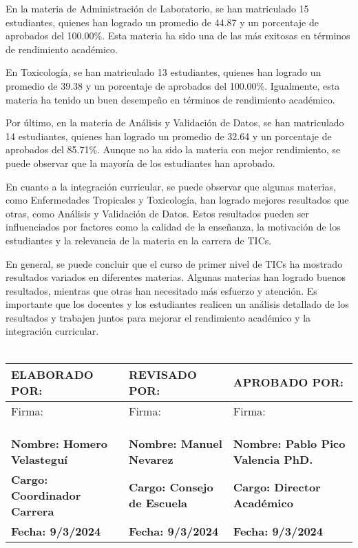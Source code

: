 En la materia de Administración de Laboratorio, se han matriculado 15 estudiantes, quienes han logrado un promedio de 44.87 y un porcentaje de aprobados del 100.00\%. Esta materia ha sido una de las más exitosas en términos de rendimiento académico.

En Toxicología, se han matriculado 13 estudiantes, quienes han logrado un promedio de 39.38 y un porcentaje de aprobados del 100.00\%. Igualmente, esta materia ha tenido un buen desempeño en términos de rendimiento académico.

Por último, en la materia de Análisis y Validación de Datos, se han matriculado 14 estudiantes, quienes han logrado un promedio de 32.64 y un porcentaje de aprobados del 85.71\%. Aunque no ha sido la materia con mejor rendimiento, se puede observar que la mayoría de los estudiantes han aprobado.

En cuanto a la integración curricular, se puede observar que algunas materias, como Enfermedades Tropicales y Toxicología, han logrado mejores resultados que otras, como Análisis y Validación de Datos. Estos resultados pueden ser influenciados por factores como la calidad de la enseñanza, la motivación de los estudiantes y la relevancia de la materia en la carrera de TICs.

En general, se puede concluir que el curso de primer nivel de TICs ha mostrado resultados variados en diferentes materias. Algunas materias han logrado buenos resultados, mientras que otras han necesitado más esfuerzo y atención. Es importante que los docentes y los estudiantes realicen un análisis detallado de los resultados y trabajen juntos para mejorar el rendimiento académico y la integración curricular.\\
\vspace{1cm}\\\begin{tabularx}{\textwidth}{|X|X|X|}
    \hline
    \textbf{ELABORADO POR:} & \textbf{REVISADO POR:} & \textbf{APROBADO POR:} \\ \hline
    Firma: & Firma: & Firma:\\
    &&\\
    &&\\
    &&\\ \hline
    \textbf{Nombre: Homero Velasteguí} & \textbf{Nombre: Manuel Nevarez} & \textbf{Nombre: Pablo Pico Valencia PhD.} \\ \hline
    \textbf{Cargo: Coordinador Carrera} & \textbf{Cargo: Consejo de Escuela} & \textbf{Cargo: Director Académico} \\ \hline
    \textbf{Fecha: 9/3/2024} & \textbf{Fecha: 9/3/2024} & \textbf{Fecha: 9/3/2024} \\ \hline
    \end{tabularx}
